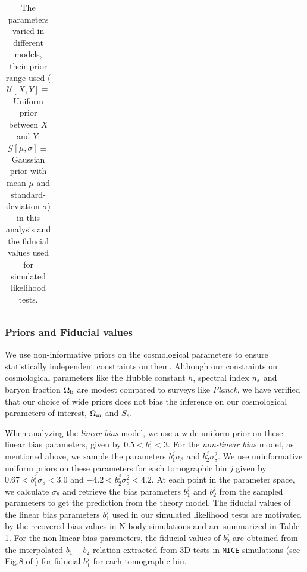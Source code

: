 \documentclass[aps, prd,twocolumn,superscriptaddress,nofootinbib,preprintnumbers]{revtex4-1}
\newcommand{\mice}{\texttt{MICE} }
\newcommand{\IR}[1]{{\color{red}[\textbf{Note for IR}: #1]}}
\begin{document}
\begin{table}[H]
\begin{tabular}{|c| c c c|}
\hline
\end{tabular}
\caption{The parameters varied in different models, their prior range used ($\mathcal{U}[X, Y] \equiv$ Uniform prior between $X$ and $Y$; $\mathcal{G}[\mu, \sigma] \equiv$ Gaussian prior with mean $\mu$ and standard-deviation $\sigma$) in this analysis and the fiducial values used for simulated likelihood tests.}
\label{tab:params_all}
\end{table}



\subsubsection{Priors and Fiducial values}
\label{sec:prior}
We use non-informative priors on the cosmological parameters to ensure statistically independent constraints on them. Although our constraints on cosmological parameters like the Hubble constant $h$, spectral index $n_{\rm s}$ and baryon fraction $\Omega_{\rm b}$ are modest compared to surveys like \textit{Planck}, we have verified that our choice of wide priors does not bias the inference on our cosmological parameters of interest, $\Omega_{\rm m}$ and $S_8$. 

When analyzing the \textit{linear bias} model, we use a wide uniform prior on these linear bias parameters, given by $0.5 < b^{j}_1 < 3$. For the \textit{non-linear bias} model, as mentioned above, we sample the parameters $b^{j}_1 \sigma_8$ and $b^{j}_2 \sigma^2_8$. We use uninformative uniform priors on these parameters for each tomographic bin $j$ given by $0.67 < b^{j}_1 \sigma_8 < 3.0$ and $-4.2 < b^{j}_2 \sigma^2_8 < 4.2$. At each point in the parameter space, we calculate  $\sigma_8$ and retrieve the bias parameters $b^{j}_1$ and $b^{j}_2$ from the sampled parameters to get the prediction from the theory model. The fiducial values of the linear bias parameters $b^{j}_1$ used in our simulated likelihood tests are motivated by the  recovered bias values in N-body simulations and are summarized in Table \ref{tab:params_all}. 
For the non-linear bias parameters, the fiducial values of $b^{j}_2$ are obtained from the interpolated $b_1-b_2$ relation extracted from 3D tests in \mice simulations (see Fig.8 of \citealt{p2020perturbation}) for fiducial $b^j_1$ for each tomographic bin.
\end{document}
